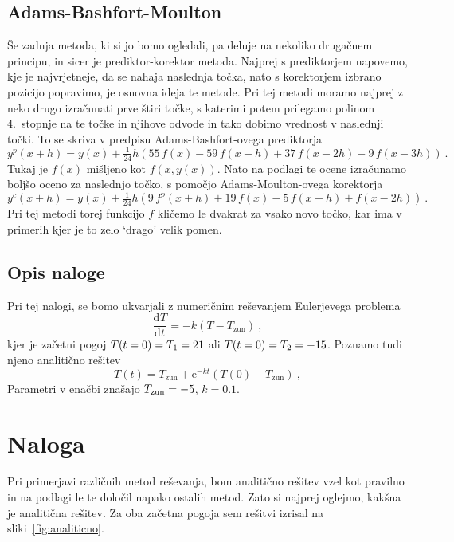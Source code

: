 \documentclass{porocilo}
\newcommand{\ddd}{\mathrm{d}}
\newcommand{\Dd}[3][{}]{\frac{\ddd^{#1} #2}{\ddd#3^{#1}}}
\begin{document}
\subsection{Adams-Bashfort-Moulton}
Še zadnja metoda, ki si jo bomo ogledali, pa deluje na nekoliko drugačnem principu, in sicer je prediktor-korektor metoda. Najprej s prediktorjem napovemo, kje je najvrjetneje, da se nahaja naslednja točka, nato s korektorjem izbrano pozicijo popravimo, je osnovna ideja te metode. Pri tej metodi moramo najprej z neko drugo izračunati prve štiri točke, s katerimi potem prilegamo polinom 4.~stopnje na te točke in njihove odvode in tako dobimo vrednost v naslednji točki. To se skriva v predpisu Adams-Bashfort-ovega prediktorja
\begin{equation*}
    y^p(x+h) = y(x) + \tfrac{1}{24}h\left(55\,f(x)-59\,f(x-h)+37\,f(x-2h)-9\,f(x-3h)\right) \>.
\end{equation*}
Tukaj je $f(x)$ mišljeno kot $f(x, y(x))$.
Nato na podlagi te ocene izračunamo boljšo oceno za naslednjo točko, s pomočjo Adams-Moulton-ovega korektorja
\begin{equation*}
    y^c(x+h) =y(x) +\tfrac{1}{24}h\left(9\,f^p(x+h)+19\,f(x)-5\,f(x-h)+f(x-2h)\right) \>.
\end{equation*}
Pri tej metodi torej funkcijo $f$ kličemo le dvakrat za vsako novo točko, kar ima v primerih kjer je to zelo `drago' velik pomen.

\subsection{Opis naloge}
Pri tej nalogi, se bomo ukvarjali z numeričnim reševanjem Eulerjevega problema
\begin{equation}
    \Dd{T}{t} = - k \left( T-T_\mathrm{zun} \right) \>,
    \label{cooling}
\end{equation}
kjer je začetni pogoj $T(t=0) = T_{\rm 1} = 21$ ali $T(t=0) = T_{\rm 2} = -15$. Poznamo tudi njeno analitično rešitev
\begin{equation*}
    T(t) = T_\mathrm{zun} + \mathrm{e}^{-kt} \left( T(0) - T_\mathrm{zun} \right) \>,
\end{equation*}
Parametri v enačbi znašajo $T_{\rm zun} = -5$, $k = \num{0.1}$.

\section{Naloga}
Pri primerjavi različnih metod reševanja, bom analitično rešitev vzel kot pravilno in na podlagi le te določil napako ostalih metod. Zato si najprej oglejmo, kakšna je analitična rešitev. Za oba začetna pogoja sem rešitvi izrisal na sliki~\ref{fig:analiticno}.
\end{document}
